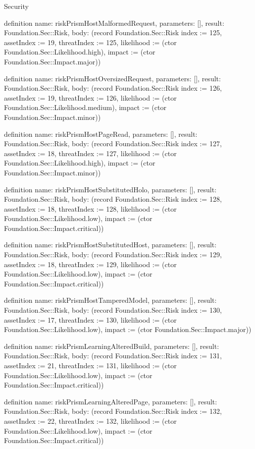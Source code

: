 \begin{lexlean}{Security}
\begin{semanticmodule}
definition{
  name: riskPrismHostMalformedRequest,
  parameters: [],
  result: Foundation.Sec::Risk,
  body: (record Foundation.Sec::Risk {index := 125, assetIndex := 19, threatIndex := 125, likelihood := (ctor Foundation.Sec::Likelihood.high), impact := (ctor Foundation.Sec::Impact.major)})
}

definition{
  name: riskPrismHostOversizedRequest,
  parameters: [],
  result: Foundation.Sec::Risk,
  body: (record Foundation.Sec::Risk {index := 126, assetIndex := 19, threatIndex := 126, likelihood := (ctor Foundation.Sec::Likelihood.medium), impact := (ctor Foundation.Sec::Impact.minor)})
}

definition{
  name: riskPrismHostPageRead,
  parameters: [],
  result: Foundation.Sec::Risk,
  body: (record Foundation.Sec::Risk {index := 127, assetIndex := 18, threatIndex := 127, likelihood := (ctor Foundation.Sec::Likelihood.high), impact := (ctor Foundation.Sec::Impact.minor)})
}

definition{
  name: riskPrismHostSubstitutedHolo,
  parameters: [],
  result: Foundation.Sec::Risk,
  body: (record Foundation.Sec::Risk {index := 128, assetIndex := 18, threatIndex := 128, likelihood := (ctor Foundation.Sec::Likelihood.low), impact := (ctor Foundation.Sec::Impact.critical)})
}

definition{
  name: riskPrismHostSubstitutedHost,
  parameters: [],
  result: Foundation.Sec::Risk,
  body: (record Foundation.Sec::Risk {index := 129, assetIndex := 18, threatIndex := 129, likelihood := (ctor Foundation.Sec::Likelihood.low), impact := (ctor Foundation.Sec::Impact.critical)})
}

definition{
  name: riskPrismHostTamperedModel,
  parameters: [],
  result: Foundation.Sec::Risk,
  body: (record Foundation.Sec::Risk {index := 130, assetIndex := 17, threatIndex := 130, likelihood := (ctor Foundation.Sec::Likelihood.low), impact := (ctor Foundation.Sec::Impact.major)})
}

definition{
  name: riskPrismLearningAlteredBuild,
  parameters: [],
  result: Foundation.Sec::Risk,
  body: (record Foundation.Sec::Risk {index := 131, assetIndex := 21, threatIndex := 131, likelihood := (ctor Foundation.Sec::Likelihood.low), impact := (ctor Foundation.Sec::Impact.critical)})
}

definition{
  name: riskPrismLearningAlteredPage,
  parameters: [],
  result: Foundation.Sec::Risk,
  body: (record Foundation.Sec::Risk {index := 132, assetIndex := 22, threatIndex := 132, likelihood := (ctor Foundation.Sec::Likelihood.low), impact := (ctor Foundation.Sec::Impact.critical)})
}


\end{semanticmodule}
\end{lexlean}

